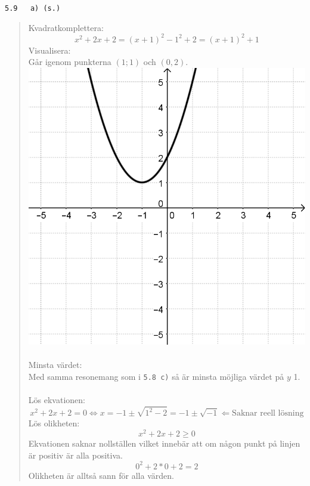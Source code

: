 \documentclass[a4paper]{article}
\newcommand{\tskcol}[1]{\textcolor{tskcol}{#1}}
\begin{document}
	\pagebreak
	\texttt{\tskcol{5.9~~~a) (s.)}}
	\begin{quotation}
		\noindent
		Kvadratkomplettera:
		\[x^2+2x+2=(x+1)^2-1^2+2=(x+1)^2+1\]
		Visualisera: \\
		Går igenom punkterna $(1;1)$ och $(0,2)$. \\
		\includegraphics[scale=0.2]{images/59a.png} \\ \\
		Minsta värdet: \\
		Med samma resonemang som i \texttt{\tskcol{5.8 c)}} så är minsta möjliga värdet på $y$ 1. \\ \\
		Lös ekvationen:
		\[x^2+2x+2=0 \Leftrightarrow
		x=-1\pm\sqrt{1^2-2}=-1\pm\sqrt{-1} \Leftarrow 
		\text{Saknar reell lösning}\]
		Lös olikheten:
		\[x^2+2x+2\ge0\]
		Ekvationen saknar nollställen vilket innebär att om någon punkt på linjen är positiv är alla positiva.
		\[0^2+2*0+2=2\]
		Olikheten är alltså sann för alla värden.
	\end{quotation}
	
\end{document}
